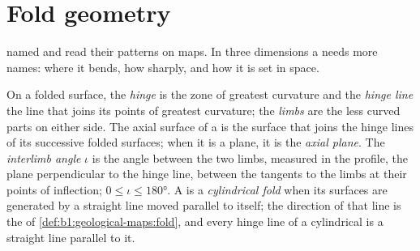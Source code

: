\section{Fold geometry}\label{sec:b1:faults-folds-fabrics:folds}

 named  and read their patterns on maps.
In three dimensions a  needs more names: where it bends, how sharply, and
how it is set in space.

\begin{definition}\label{def:b1:faults-folds-fabrics:fold-elements}
On a folded surface, the \emph{hinge} is the zone
of greatest curvature and the \emph{hinge line} the line that
joins its points of greatest curvature; the \emph{limbs} are the less curved parts on either side. The axial surface of a 
is the surface that joins the hinge lines of its successive folded surfaces;
when it is a plane, it is the \emph{axial plane}. The
\emph{interlimb angle} $\iota$ is the angle between the
two limbs, measured in the profile, the plane perpendicular to the hinge line,
between the tangents to the limbs at their points of inflection;
$0 \le \iota \le \ang{180}$. A  is a \emph{cylindrical
fold} when its surfaces are generated by a straight
line moved parallel to itself; the direction of that line is the  of
\cref{def:b1:geological-maps:fold}, and every hinge line of a cylindrical 
is a straight line parallel to it.
\end{definition}

